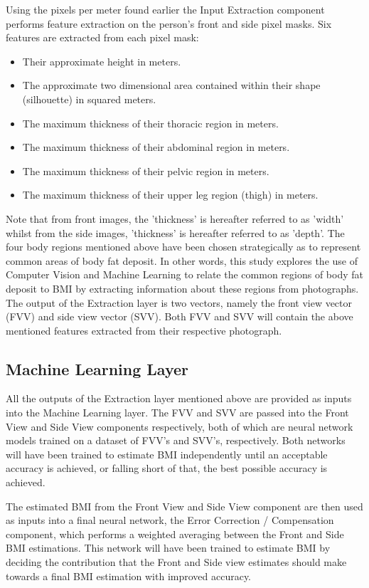 \documentclass[conference]{IEEEtran}
\begin{document}
Using the pixels per meter found earlier the Input Extraction component performs feature extraction on the person's front and side pixel masks.
Six features are extracted from each pixel mask:
\begin{itemize}
	\item Their approximate height in meters.
	\item The approximate two dimensional area contained within their shape (silhouette) in squared meters.
	\item The maximum thickness of their thoracic region in meters.
	\item The maximum thickness of their abdominal region in meters.
	\item The maximum thickness of their pelvic region in meters.
	\item The maximum thickness of their upper leg region (thigh) in meters.	
\end{itemize}
Note that from front images, the 'thickness' is hereafter referred to as 'width' whilst from the side images, 'thickness' is hereafter referred to as 'depth'.
The four body regions mentioned above have been chosen strategically as to represent common areas of body fat deposit. %
In other words, this study explores the use of Computer Vision and Machine Learning to relate the common regions of body fat deposit to BMI by extracting information about these regions from photographs.
The output of the Extraction layer is two vectors, namely the front view vector (FVV) and side view vector (SVV).
Both FVV and SVV will contain the above mentioned features extracted from their respective photograph.

\subsection{Machine Learning Layer}
All the outputs of the Extraction layer mentioned above are provided as inputs into the Machine Learning layer.
The FVV and SVV are passed into the Front View and Side View components respectively, both of which are neural network models trained on a dataset of FVV's and SVV's, respectively.
Both networks will have been trained to estimate BMI independently until an acceptable accuracy is achieved, or falling short of that, the best possible accuracy is achieved.

The estimated BMI from the Front View and Side View component are then used as inputs into a final neural network, the Error Correction / Compensation component, which performs a weighted averaging between the Front and Side BMI estimations.
This network will have been trained to estimate BMI by deciding the contribution that the Front and Side view estimates should make towards a final BMI estimation with improved accuracy.
\end{document}
